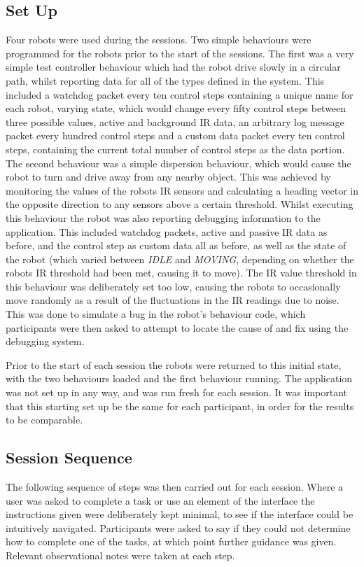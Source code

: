 \subsection{Set Up}
Four robots were used during the sessions. Two simple behaviours were programmed for the robots prior to the start of the sessions. The first was a very simple test controller behaviour which had the robot drive slowly in a circular path, whilst reporting data for all of the types defined in the system. This included a watchdog packet every ten control steps containing a unique name for each robot,  varying state, which would change every fifty control steps between three possible values, active and background IR data, an arbitrary log message packet every hundred control steps and a custom data packet every ten control steps, containing the current total number of control steps as the data portion. The second behaviour was a simple dispersion behaviour, which would cause the robot to turn and drive away from any nearby object. This was achieved by monitoring the values of the robots IR sensors and calculating a heading vector in the opposite direction to any sensors above a certain threshold. Whilst executing this behaviour the robot was also reporting debugging information to the application. This included watchdog packets, active and passive IR data as before, and the control step as custom data all as before, as well as the state of the robot (which varied between \textit{IDLE} and \textit{MOVING}, depending on whether the robots IR threshold had been met, causing it to move). The IR value threshold in this behaviour was deliberately set too low, causing the robots to occasionally move randomly as a result of the fluctuations in the IR readings due to noise. This was done to simulate a bug in the robot's behaviour code, which participants were then asked to attempt to locate the cause of and fix using the debugging system.

Prior to the start of each session the robots were returned to this initial state, with the two behaviours loaded and the first behaviour running. The application was not set up in any way, and was run fresh for each session. It was important that this starting set up be the same for each participant, in order for the results to be comparable.

\subsection{Session Sequence}
The following sequence of steps was then carried out for each session. Where a user was asked to complete a task or use an element of the interface the instructions given were deliberately kept minimal, to see if the interface could be intuitively navigated. Participants were asked to say if they could not determine how to complete one of the tasks, at which point further guidance was given. Relevant observational notes were taken at each step.

